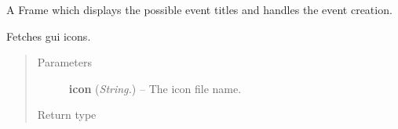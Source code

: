 \documentclass[letterpaper,10pt,english]{sphinxmanual}
\begin{document}

\begin{fulllineitems}
\label{api:wos.EventList}
A Frame which displays the possible event titles and handles the event creation.

\begin{fulllineitems}
\label{api:wos.EventList.GetIcon}
Fetches gui icons.
\begin{quote}\begin{description}
\item[{Parameters}] \leavevmode
\textbf{icon} (\emph{String.}) -- The icon file name.

\item[{Return type}] \leavevmode
{}

\end{description}\end{quote}

\end{fulllineitems}


\end{fulllineitems}

\end{document}
